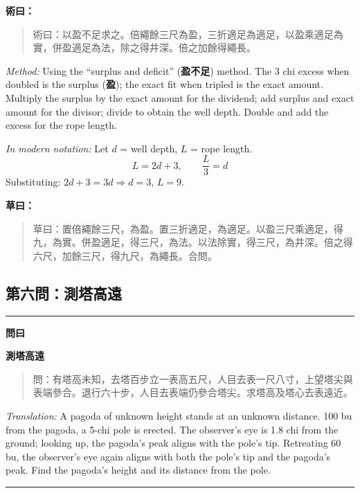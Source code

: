 \documentclass[11pt,a4paper]{article}
\newenvironment{problem}[1][]{%
  \medskip\noindent\rule{\textwidth}{0.4pt}%
  \par\noindent\textbf{\color{sectioncolor}#1}\par\nopagebreak%
  \smallskip%
}{%
  \par\noindent\rule{\textwidth}{0.4pt}\medskip%
}
\newenvironment{method}{%
  \medskip\noindent{\color{methodcolor}\rule{0.5\textwidth}{0.5pt}}%
  \par\color{methodcolor}%
}{%
  \par\medskip%
}
\begin{document}
\begin{method}
\textbf{術曰：}

\begin{quote}
\textcolor{chinacolor}{%
術曰：以盈不足求之。倍繩餘三尺為盈，三折適足為適足，以盈乘適足為實，併盈適足為法，除之得井深。倍之加餘得繩長。
}
\end{quote}

\textit{Method:} Using the ``surplus and deficit'' (\textbf{盈不足}) method. The 
3 chi excess when doubled is the surplus (\textbf{盈}); the exact fit when tripled is 
the exact amount. Multiply the surplus by the exact amount for the 
dividend; add surplus and exact amount for the divisor; divide to obtain 
the well depth. Double and add the excess for the rope length.

\medskip
\textit{In modern notation:} Let $d$ = well depth, $L$ = rope length.
\[
L = 2d + 3, \qquad \frac{L}{3} = d
\]
Substituting: $2d + 3 = 3d \Rightarrow d = 3$, $L = 9$.
\end{method}

\noindent\textbf{草曰：}
\begin{quote}
\textcolor{chinacolor}{%
草曰：置倍繩餘三尺，為盈。置三折適足，為適足。以盈三尺乘適足，得九，為實。併盈適足，得三尺，為法。以法除實，得三尺，為井深。倍之得六尺，加餘三尺，得九尺，為繩長。合問。
}
\end{quote}

\subsection*{第六問：測塔高遠}

\begin{problem}[\textbf{問曰}]
\textbf{\color{sectioncolor}測塔高遠}

\begin{quote}
\textcolor{chinacolor}{%
問：有塔高未知，去塔百步立一表高五尺，人目去表一尺八寸，上望塔尖與表端參合。退行六十步，人目去表端仍參合塔尖。求塔高及塔心去表遠近。
}
\end{quote}

\textit{Translation:} A pagoda of unknown height stands at an unknown 
distance. 100 bu from the pagoda, a 5-chi pole is erected. The observer's 
eye is 1.8 chi from the ground; looking up, the pagoda's peak aligns 
with the pole's tip. Retreating 60 bu, the observer's eye again aligns 
with both the pole's tip and the pagoda's peak. Find the pagoda's height 
and its distance from the pole.
\end{problem}
\end{document}
